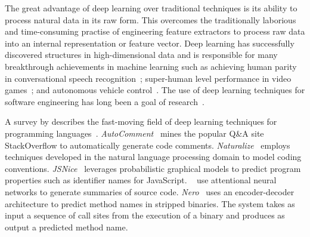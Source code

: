 The great advantage of deep learning over traditional techniques is its ability to process natural data in its raw form. This overcomes the traditionally laborious and time-consuming practise of engineering feature extractors to process raw data into an internal representation or feature vector. Deep learning has successfully discovered structures in high-dimensional data and is responsible for many breakthrough achievements in machine learning such as achieving human parity in conversational speech recognition~\cite{Xiong2016}; super-human level performance in video games~\cite{Mnih2015}; and autonomous vehicle control~\cite{Lozano-Perez2012}. The use of deep learning techniques for software engineering has long been a goal of research~\cite{White2015a}.

A \citeyear{Allamanis2017a} survey by \citeauthor{Allamanis2017a} describes the fast-moving field of deep learning techniques for programming languages~\cite{Allamanis2017a}.
\emph{AutoComment}~\cite{Wong2013} mines the popular Q\&A site StackOverflow to automatically generate code comments.
\emph{Naturalize}~\cite{Allamanis2014a} employs techniques developed in the natural language processing domain to model coding conventions.
\emph{JSNice}~\cite{Raychev2015} leverages probabilistic graphical models to predict program properties such as identifier names for JavaScript.
\citeauthor{Allamanis2016}~\cite{Allamanis2016} use attentional neural networks to generate summaries of source code.
\emph{Nero}~\cite{David2019} uses an encoder-decoder architecture to predict method names in stripped binaries. The system takes as input a sequence of call sites from the execution of a binary and produces as output a predicted method name.

